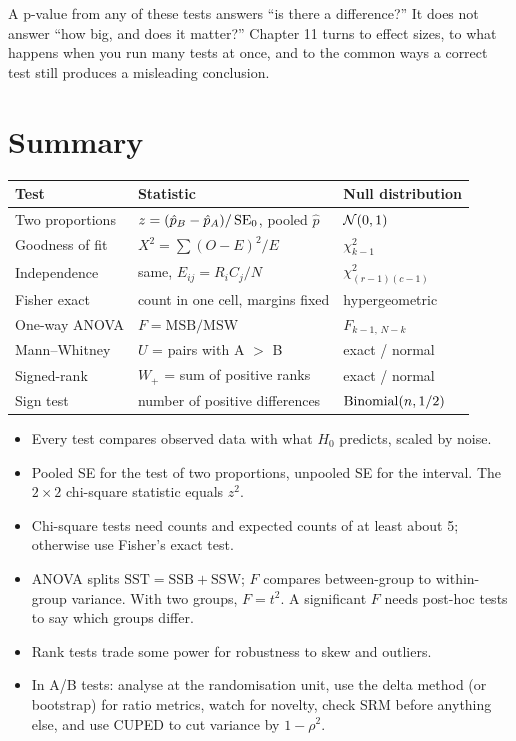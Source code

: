 A p-value from any of these tests answers ``is there a difference?'' It does
not answer ``how big, and does it matter?'' Chapter 11 turns to effect sizes,
to what happens when you run many tests at once, and to the common ways a
correct test still produces a misleading conclusion.

\section{Summary}

\begin{center}
\begin{tabular}{p{3.3cm}p{4.6cm}p{4.6cm}}
\toprule
Test & Statistic & Null distribution \\
\midrule
Two proportions & $z = (\hat p_B - \hat p_A)/\operatorname{SE}_0$, pooled $\hat p$ & $\mathcal{N}(0,1)$ \\
Goodness of fit & $X^2 = \sum (O-E)^2/E$ & $\chi^2_{k-1}$ \\
Independence & same, $E_{ij} = R_iC_j/N$ & $\chi^2_{(r-1)(c-1)}$ \\
Fisher exact & count in one cell, margins fixed & hypergeometric \\
One-way ANOVA & $F = \text{MSB}/\text{MSW}$ & $F_{k-1,\,N-k}$ \\
Mann--Whitney & $U$ = pairs with A $>$ B & exact / normal \\
Signed-rank & $W_+$ = sum of positive ranks & exact / normal \\
Sign test & number of positive differences & $\operatorname{Binomial}(n, 1/2)$ \\
\bottomrule
\end{tabular}
\end{center}

\begin{itemize}
  \item Every test compares observed data with what $H_0$ predicts, scaled by noise.
  \item Pooled SE for the test of two proportions, unpooled SE for the interval.
    The $2\times 2$ chi-square statistic equals $z^2$.
  \item Chi-square tests need counts and expected counts of at least about 5;
    otherwise use Fisher's exact test.
  \item ANOVA splits $\text{SST} = \text{SSB} + \text{SSW}$; $F$ compares
    between-group to within-group variance. With two groups, $F = t^2$.
    A significant $F$ needs post-hoc tests to say which groups differ.
  \item Rank tests trade some power for robustness to skew and outliers.
  \item In A/B tests: analyse at the randomisation unit, use the delta method
    (or bootstrap) for ratio metrics, watch for novelty, check SRM before
    anything else, and use CUPED to cut variance by $1-\rho^2$.
\end{itemize}

